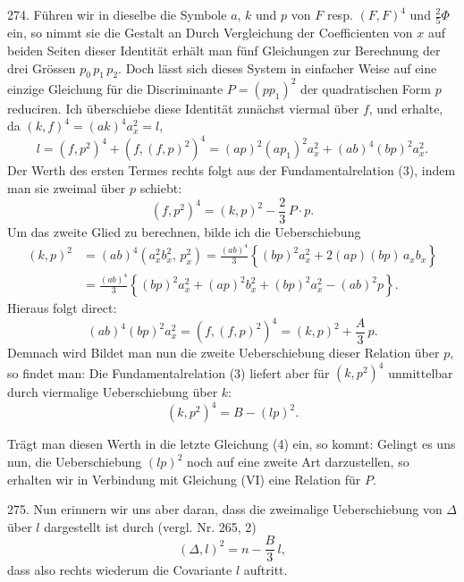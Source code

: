 274. Führen wir in dieselbe die Symbole $a$, $k$ und $p$ von $F$ resp. $(F,F)^4$ und $\frac{2}{5}\Phi$ ein, so nimmt sie die Gestalt an
Durch Vergleichung der Coefficienten von $x$ auf beiden Seiten dieser Identität erhält man fünf Gleichungen zur Berechnung der drei Grössen $p_0\,p_1\,p_2$. Doch lässt sich dieses System in einfacher Weise auf eine einzige Gleichung für die Discriminante $P=(pp_1)^2$ der quadratischen Form $p$ reduciren. Ich überschiebe diese Identität zunächst viermal über $f$, und erhalte, da $(k,f)^4=(ak)^4 a_x^2=l$,
\[
l = (f,p^2)^4 + (f,(f,p)^2)^4 = (ap)^2(ap_1)^2 a_x^2 + (ab)^4(bp)^2 a_x^2.
\]
Der Werth des ersten Termes rechts folgt aus der Fundamentalrelation (3), indem man sie zweimal über $p$ schiebt:
\[
(f,p^2)^4 = (k,p)^2 - \frac{2}{3}\,P\cdot p.
\]
Um das zweite Glied zu berechnen, bilde ich die Ueberschiebung
\[
\begin{aligned}
(k,p)^2 &= (ab)^4(a_x^2 b_x^2,\, p_x^2) = \frac{(ab)^4}{3}\left\{ (bp)^2 a_x^2 + 2(ap)(bp)\,a_x b_x \right\} \\
&= \frac{(ab)^4}{3}\left\{ (bp)^2 a_x^2 + (ap)^2 b_x^2 + (bp)^2 a_x^2 - (ab)^2 p \right\}.
\end{aligned}
\]
Hieraus folgt direct:
\[
(ab)^4(bp)^2 a_x^2 = (f,(f,p)^2)^4 = (k,p)^2 + \frac{A}{3}\,p.
\]
Demnach wird
Bildet man nun die zweite Ueberschiebung dieser Relation über $p$, so findet man:
Die Fundamentalrelation (3) liefert aber für $(k,p^2)^4$ unmittelbar durch viermalige Ueberschiebung über $k$:
\[
(k,p^2)^4 = B - (lp)^2.
\]


Trägt man diesen Werth in die letzte Gleichung (4) ein, so kommt:
Gelingt es uns nun, die Ueberschiebung $(lp)^2$ noch auf eine zweite Art darzustellen, so erhalten wir in Verbindung mit Gleichung (VI) eine Relation für $P$.

275. Nun erinnern wir uns aber daran, dass die zweimalige Ueberschiebung von $\Delta$ über $l$ dargestellt ist durch (vergl. Nr. 265, 2)
\[
(\Delta,l)^2 = n - \frac{B}{3}\,l,
\]
dass also rechts wiederum die Covariante $l$ auftritt.

